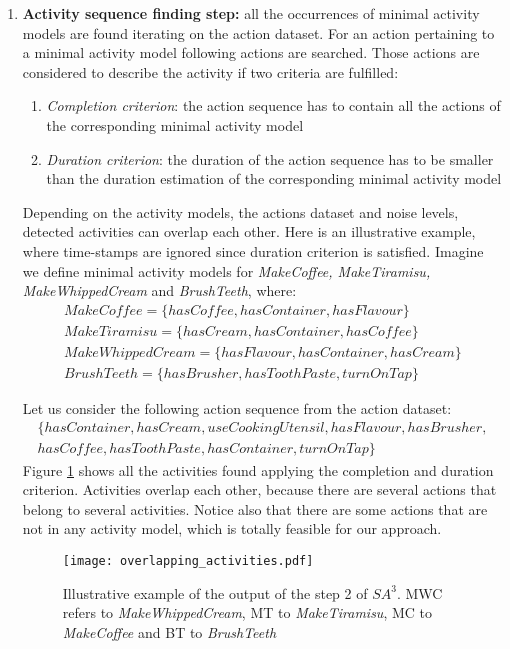 \begin{enumerate}
 \item \textbf{Activity sequence finding step:} all the occurrences of minimal activity models are found iterating on the action dataset. For an action pertaining to a minimal activity model following actions are searched. Those actions are considered to describe the activity if two criteria are fulfilled: 
 \begin{enumerate}
  \item \textit{Completion criterion}: the action sequence has to contain all the actions of the corresponding minimal activity model
  \item \textit{Duration criterion}: the duration of the action sequence has to be smaller than the duration estimation of the corresponding minimal activity model
 \end{enumerate}
 Depending on the activity models, the actions dataset and noise levels, detected activities can overlap each other. Here is an illustrative example, where time-stamps are ignored since duration criterion is satisfied. Imagine we define minimal activity models for \textit{MakeCoffee, MakeTiramisu, MakeWhippedCream} and \textit{BrushTeeth}, where:
 \begin{equation*}
  \begin{split}
   MakeCoffee =\{hasCoffee, hasContainer, hasFlavour\} \\
  MakeTiramisu = \{hasCream, hasContainer, hasCoffee\} \\
  MakeWhippedCream = \{hasFlavour, hasContainer, hasCream\} \\
  BrushTeeth = \{hasBrusher, hasToothPaste, turnOnTap\} 
  \end{split}
 \end{equation*} 
 
Let us consider the following action sequence from the action dataset:
\begin{equation*}
\begin{split}
 \{hasContainer, hasCream, useCookingUtensil, hasFlavour, hasBrusher, \\ 
 hasCoffee, hasToothPaste, hasContainer, turnOnTap\}
\end{split}  
\end{equation*}
Figure \ref{fig:overlap} shows all the activities found applying the completion and duration criterion. Activities overlap each other, because there are several actions that belong to several activities. Notice also that there are some actions that are not in any activity model, which is totally feasible for our approach.
\begin{figure}[htbp]
\centering
\texttt{[image: overlapping\_activities.pdf]}
    \caption{Illustrative example of the output of the step 2 of $SA^3$. MWC refers to \textit{MakeWhippedCream}, MT to \textit{MakeTiramisu}, MC to \textit{MakeCoffee} and BT to \textit{BrushTeeth}}
    \label{fig:overlap}
\end{figure}


\end{enumerate}
